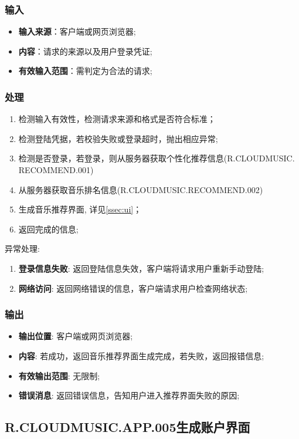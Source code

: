 \subsubsection{输入}
	\begin{itemize}
		\item \textbf{输入来源}：客户端或网页浏览器;
		\item \textbf{内容}：请求的来源以及用户登录凭证;
		\item \textbf{有效输入范围}：需判定为合法的请求;
	\end{itemize}
\subsubsection{处理}
	\begin{enumerate}
		\item 检测输入有效性，检测请求来源和格式是否符合标准；
		\item 检测登陆凭据，若校验失败或登录超时，抛出相应异常;
    \item 检测是否登录，若登录，则从服务器获取个性化推荐信息(R.CLOUDMUSIC.
    RECOMMEND.001)
		\item 从服务器获取音乐排名信息(R.CLOUDMUSIC.RECOMMEND.002)
		\item 生成音乐推荐界面, 详见\ref{ssec:ui}；
		\item 返回完成的信息;
	\end{enumerate}
	\noindent 异常处理: 
	\begin{enumerate}
		\item \textbf{登录信息失败}: 返回登陆信息失效，客户端将请求用户重新手动登陆;
		\item \textbf{网络访问}: 返回网络错误的信息，客户端请求用户检查网络状态;
	\end{enumerate}
\subsubsection{输出}
\begin{itemize}
	\item \textbf{输出位置}: 客户端或网页浏览器;
	\item \textbf{内容}: 若成功，返回音乐推荐界面生成完成，若失败，返回报错信息;
	\item \textbf{有效输出范围}: 无限制;
	\item \textbf{错误消息}: 返回错误信息，告知用户进入推荐界面失败的原因;
\end{itemize}

\subsection{R.CLOUDMUSIC.APP.005生成账户界面}
